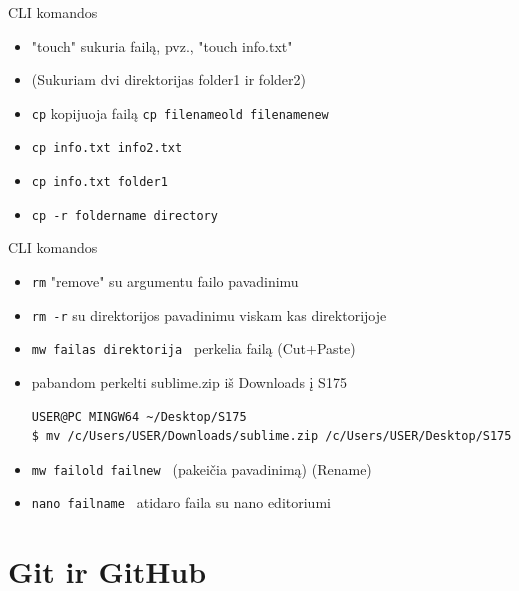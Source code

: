 \documentclass[11pt,xcolor=table]{beamer}
\begin{document}
\begin{frame}{CLI komandos}
\begin{itemize}
\item "touch" sukuria failą, pvz., "touch info.txt"
\item (Sukuriam dvi direktorijas folder1 ir folder2)
\item \colorbox{listinggray}{\lstinline|cp|}  kopijuoja failą \colorbox{listinggray}{\lstinline|cp filenameold filenamenew|} 
\item \colorbox{listinggray}{\lstinline|cp info.txt info2.txt|} 
\item \colorbox{listinggray}{\lstinline|cp info.txt folder1|} 
\item \colorbox{listinggray}{\lstinline|cp -r foldername directory|} 
\end{itemize}
\end{frame}

\begin{frame}[fragile]{CLI komandos}
\begin{itemize}
\item \colorbox{listinggray}{\lstinline|rm|}  "remove" su argumentu failo pavadinimu
\item \colorbox{listinggray}{\lstinline|rm -r|}  su direktorijos pavadinimu viskam kas direktorijoje
\item \colorbox{listinggray}{\lstinline|mw failas direktorija |} perkelia failą (Cut+Paste)
\item pabandom perkelti sublime.zip iš Downloads į S175
\begin{lstlisting}
USER@PC MINGW64 ~/Desktop/S175
$ mv /c/Users/USER/Downloads/sublime.zip /c/Users/USER/Desktop/S175

\end{lstlisting}

\item \colorbox{listinggray}{\lstinline|mw failold failnew |} (pakeičia pavadinimą) (Rename)
\item \colorbox{listinggray}{\lstinline|nano failname |} atidaro faila su nano editoriumi
\end{itemize}
\end{frame}

\section{Git ir GitHub}
\end{document}
